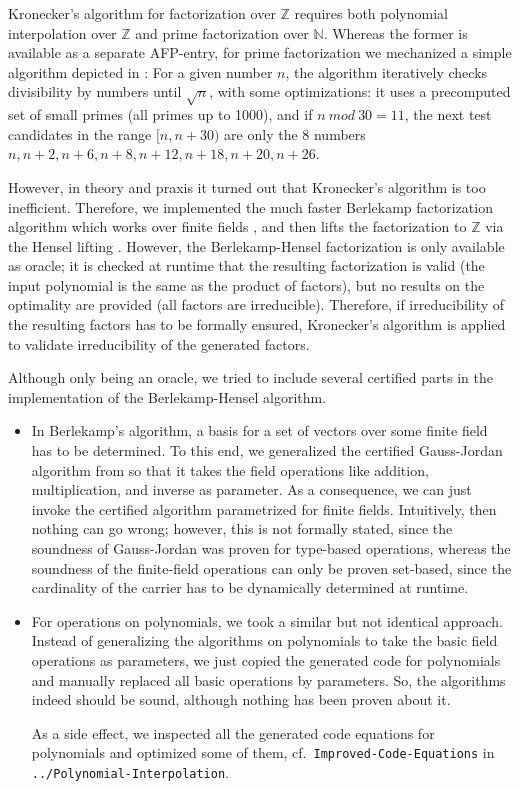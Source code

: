 \documentclass[11pt,a4paper]{article}
\newcommand\ints{\mathbb{Z}}
\newcommand\nats{\mathbb{N}}
\newcommand\mod{\mathit{mod}}
\begin{document}
Kronecker's algorithm for factorization over $\ints$ requires both
polynomial interpolation over $\ints$ and prime factorization over $\nats$. Whereas the former
is available as a separate AFP-entry, for prime factorization we mechanized a simple algorithm depicted
in \cite{Knuth}:
For a given number $n$,
the algorithm iteratively checks divisibility by numbers until $\sqrt n$,
with some optimizations:
it uses a precomputed set of small primes (all primes up to 1000), 
and if $n\ \mod\ 30 = 11$, the next test candidates in the range $[n,n+30)$ 
are only the 8 numbers $n,n+2,n+6,n+8,n+12,n+18,n+20,n+26$.

However, in theory and praxis it turned out that Kronecker's algorithm is too inefficient. 
Therefore, we implemented the much faster Berlekamp factorization algorithm which works over finite fields \cite{Berlekamp}, and
then lifts the factorization to $\ints$ via the Hensel lifting \cite{Hensel}. However, the Berlekamp-Hensel
factorization is only available as oracle; it is checked at runtime that the resulting
factorization is valid (the input polynomial is the same as the product of factors), 
but no results on the optimality are provided (all factors are irreducible). 
Therefore, if irreducibility of the resulting factors has to be formally ensured, 
Kronecker's algorithm is applied to validate irreducibility of the generated factors.

Although only being an oracle, we tried to include several certified parts in the implementation
of the Berlekamp-Hensel algorithm.
\begin{itemize}
\item In Berlekamp's algorithm, a basis for a set of vectors over some finite field has to be determined.
  To this end, we generalized the certified Gauss-Jordan algorithm from \cite{JNF-AFP} so that 
  it takes the field operations like addition, multiplication, and inverse as parameter. 
  As a consequence, we can just invoke the certified algorithm 
  parametrized for finite fields. Intuitively, then nothing can go wrong; however, this is not
  formally stated, since the soundness of Gauss-Jordan was proven for type-based operations, whereas
  the soundness of the finite-field operations can only be proven set-based, since the cardinality of the
  carrier has to be dynamically determined at runtime.
\item For operations on polynomials, we took a similar but not identical approach. Instead of 
  generalizing the algorithms on polynomials to take the basic field operations as parameters, we just
  copied the generated code for polynomials and manually replaced all basic operations by parameters.
  So, the algorithms indeed should be sound, although nothing has been proven about it.
  
  As a side effect, we inspected all the generated code equations for polynomials and optimized some of them,
  cf.\ \texttt{Improved-Code-Equations} in \texttt{../Polynomial-Interpolation}.
\end{itemize}
\end{document}
